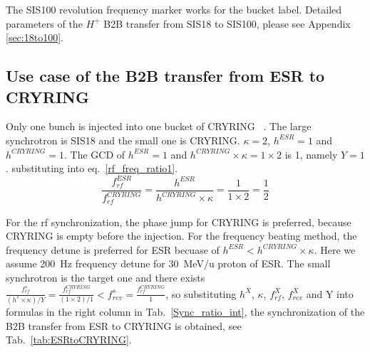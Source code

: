 The SIS100 revolution frequency marker works for the bucket label. Detailed parameters of the $H^{+}$ B2B transfer from SIS18 to SIS100, please see Appendix \ref{sec:18to100}.
\subsection{Use case of the B2B transfer from ESR to CRYRING}
Only one bunch is injected into one bucket of CRYRING ~\cite{herfurth_low_2013, lestinsky_cryring_2015}. The large synchrotron is SIS18 and the small one is CRYRING. $\kappa=2$, $h^{\mathit{ESR}}=1$ and $h^{\mathit{CRYRING}}=1$. The GCD of $h^{\mathit{ESR}}=1$ and $h^{\mathit{CRYRING}} \times \kappa=1\times 2$ is 1, namely $Y=1$. substituting into eq.~\ref{rf_freq_ratio1}. 
\begin{equation}
\frac{f_{\mathit{rf}}^{\mathit{ESR}}}{f_{\mathit{rf}}^{\mathit{CRYRING}}}= \frac {h^{\mathit{ESR}}}{h^{\mathit{CRYRING}} \times \kappa}= \frac{1}{1 \times 2}=\frac{1}{2}
\end{equation}

For the rf synchronization, the phase jump for CRYRING is preferred, because CRYRING is empty before the injection. For the frequency beating method, the frequency detune is preferred for ESR becuase of $h^{\mathit{ESR}} < h^{\mathit{CRYRING}} \times \kappa$. Here we assume \SI{200}{Hz} frequency detune for \SI{30}{MeV/\atomicmassunit} proton of ESR. The small synchrotron is the target one and there exists $\frac{f_{\mathit{rf}}^{s}}{(h^s\times \kappa)/Y}=\frac{f_{\mathit{rf}}^{\mathit{CRYRING}}}{(1\times 2)/1}< f_{\mathit{rev}}^{s}=\frac{f_{\mathit{rf}}^{\mathit{CRYRING}}}{1}$, so substituting $h^X$, $\kappa$, $f_{\mathit{rf}}^{X}$, $f_{\mathit{rev}}^{X}$ and Y into formulas in the right column in Tab.~\ref{Sync_ratio_int}, the synchronization of the B2B transfer from ESR to CRYRING is obtained, see Tab.~\ref{tab:ESRtoCRYRING}.

